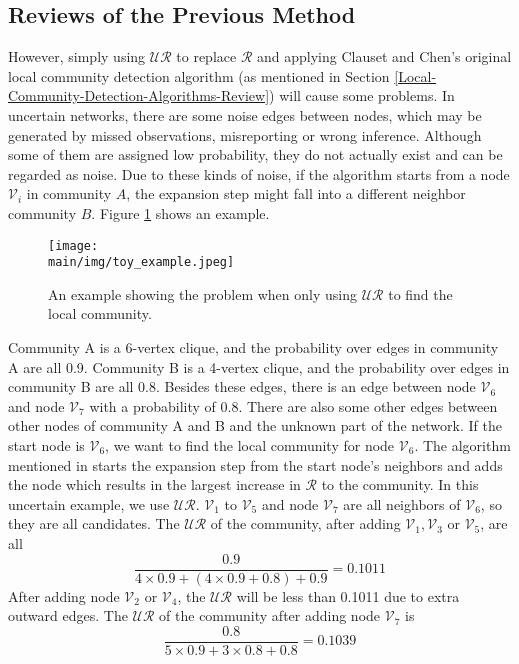 \documentclass[\main/thesis.tex]{subfiles}
\begin{document}
\subsection{Reviews of the Previous Method} \label{local-problem-section}
However, simply using $\mathcal{UR}$ to replace $\mathcal{R}$ and applying Clauset and Chen's original local community detection algorithm (as mentioned in Section \ref{Local-Community-Detection-Algorithms-Review}) will cause some problems. In uncertain networks, there are some noise edges between nodes, which may be generated by missed observations, misreporting or wrong inference. Although some of them are assigned low probability, they do not actually exist and can be regarded as noise. Due to these kinds of noise, if the algorithm starts from a node $\mathcal{V}_i$ in community $A$, the expansion step might fall into a different neighbor community $B$. Figure \ref{problem_example} shows an example.

\begin{figure}
\centering
\texttt{[image: \\main/img/toy\_example.jpeg]}
\caption{An example showing the problem when only using $\mathcal{UR}$ to find the local community.}
\label{problem_example}
\end{figure}

Community A is a 6-vertex clique, and the probability over edges in community A are all 0.9. Community B is a 4-vertex clique, and the probability over edges in community B are all 0.8. Besides these edges, there is an edge between node $\mathcal{V}_6$ and node $\mathcal{V}_7$ with a probability of 0.8. There are also some other edges between other nodes of community A and B and the unknown part of the network. If the start node is $\mathcal{V}_6$, we want to find the local community for node $\mathcal{V}_6$. The algorithm mentioned in \cite{clauset2005finding,chen2009detecting} starts the expansion step from the start node's neighbors and adds the node which results in the largest increase in $\mathcal{R}$ to the community. In this uncertain example, we use $\mathcal{UR}$. $\mathcal{V}_1$ to $\mathcal{V}_5$ and node $\mathcal{V}_7$ are all neighbors of $\mathcal{V}_6$, so they are all candidates. The $\mathcal{UR}$ of the community, after adding $\mathcal{V}_1, \mathcal{V}_3$ or $\mathcal{V}_5$, are all 
\begin{equation}
\frac{0.9}{4\times0.9+(4\times0.9+0.8)+0.9}=0.1011
\label{value-after-add-135}
\end{equation}
After adding node $\mathcal{V}_2$ or $\mathcal{V}_4$, the $\mathcal{UR}$ will be less than 0.1011 due to extra outward edges. The $\mathcal{UR}$ of the community after adding node $\mathcal{V}_7$ is 
\begin{equation}
\frac{0.8}{5\times0.9+3\times0.8+0.8}=0.1039
\end{equation}
\end{document}
